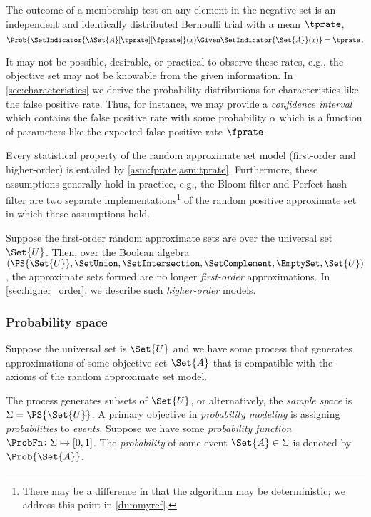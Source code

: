 \documentclass[ ../main.tex]{subfiles}
\begin{document}
\begin{axiom}
\label{asm:tprate}
The outcome of a membership test on any element in the negative set is an independent and identically distributed Bernoulli trial with a mean $\tprate$,
\begin{equation}
\label{eq:axiom_tprate}
    \Prob{\SetIndicator{\ASet{A}[\tprate][\fprate]}(x) \Given \SetIndicator{\Set{A}}(x)} = \tprate\,.
\end{equation}
\end{axiom}

It may not be possible, desirable, or practical to observe these rates, e.g., the objective set may not be knowable from the given information.
In \cref{sec:characteristics} we derive the probability distributions for characteristics like the false positive rate.
Thus, for instance, we may provide a \emph{confidence interval} which contains the false positive rate with some probability $\alpha$ which is a function of parameters like the expected false positive rate $\fprate$.

Every statistical property of the random approximate set model (first-order and higher-order) is entailed by \cref{asm:fprate,asm:tprate}.
Furthermore, these assumptions generally hold in practice, e.g., the Bloom filter\cite{bf} and Perfect hash filter\cite{phf} are two separate implementations\footnote{There may be a difference in that the algorithm may be deterministic; we address this point in \cref{dummyref}.} of the random positive approximate set in which these assumptions hold.

Suppose the first-order random approximate sets are over the universal set $\Set{U}$.
Then, over the Boolean algebra $(\PS{\Set{U}},\SetUnion,\SetIntersection,\SetComplement,\EmptySet,\Set{U})$, the approximate sets formed are no longer \emph{first-order} approximations.
In \cref{sec:higher_order}, we describe such \emph{higher-order} models.

\subsubsection{Probability space}
\label{sec:prob_model}
Suppose the universal set is $\Set{U}$ and we have some process that generates approximations of some objective set $\Set{A}$ that is compatible with the axioms of the random approximate set model.


The process generates subsets of $\Set{U}$, or alternatively, the \emph{sample space} is $\Sigma = \PS{\Set{U}}$.
A primary objective in \emph{probability modeling} is assigning \emph{probabilities} to \emph{events}.
Suppose we have some \emph{probability function} $\ProbFn \colon \Sigma \mapsto [0,1]$.
The \emph{probability} of some event $\Set{A} \in \Sigma$ is denoted by $\Prob{\Set{A}}$.
\end{document}
